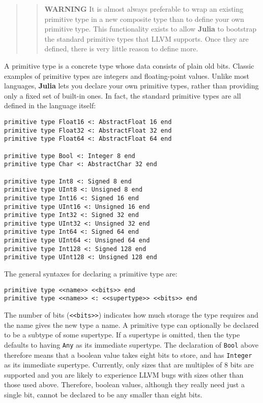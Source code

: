 \documentclass[
]{article}
\begin{document}
\begin{quote}
\begin{quote}
\textbf{WARNING} It is almost always preferable to wrap an existing
primitive type in a new composite type than to define your own primitive
type. This functionality exists to allow \textbf{Julia} to bootstrap the
standard primitive types that LLVM supports. Once they are defined,
there is very little reason to define more.
\end{quote}
\end{quote}

A primitive type is a concrete type whose data consists of plain old
bits. Classic examples of primitive types are integers and
floating-point values. Unlike most languages, \textbf{Julia} lets you
declare your own primitive types, rather than providing only a fixed set
of built-in ones. In fact, the standard primitive types are all defined
in the language itself:

\begin{verbatim}
primitive type Float16 <: AbstractFloat 16 end
primitive type Float32 <: AbstractFloat 32 end
primitive type Float64 <: AbstractFloat 64 end

primitive type Bool <: Integer 8 end
primitive type Char <: AbstractChar 32 end

primitive type Int8 <: Signed 8 end
primitive type UInt8 <: Unsigned 8 end
primitive type Int16 <: Signed 16 end
primitive type UInt16 <: Unsigned 16 end
primitive type Int32 <: Signed 32 end
primitive type UInt32 <: Unsigned 32 end
primitive type Int64 <: Signed 64 end
primitive type UInt64 <: Unsigned 64 end
primitive type Int128 <: Signed 128 end
primitive type UInt128 <: Unsigned 128 end
\end{verbatim}

The general syntaxes for declaring a primitive type are:

\begin{verbatim}
primitive type <<name>> <<bits>> end
primitive type <<name>> <: <<supertype>> <<bits>> end
\end{verbatim}

The number of bits
(\texttt{\textless{}\textless{}bits\textgreater{}\textgreater{}})
indicates how much storage the type requires and the name gives the new
type a name. A primitive type can optionally be declared to be a subtype
of some supertype. If a supertype is omitted, then the type defaults to
having \texttt{Any} as its immediate supertype. The declaration of
\texttt{Bool} above therefore means that a boolean value takes eight
bits to store, and has \texttt{Integer} as its immediate supertype.
Currently, only sizes that are multiples of 8 bits are supported and you
are likely to experience LLVM bugs with sizes other than those used
above. Therefore, boolean values, although they really need just a
single bit, cannot be declared to be any smaller than eight bits.
\end{document}

